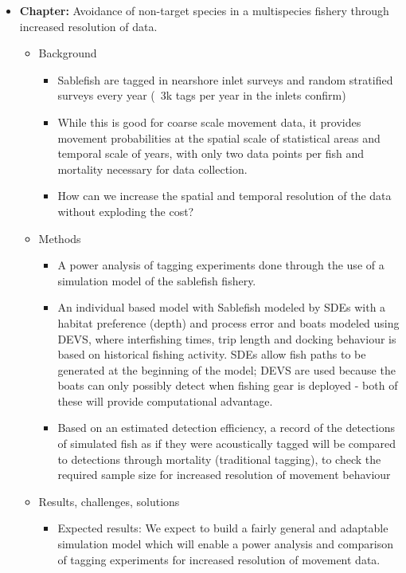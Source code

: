 \documentclass{article}
\newcommand{\sj}[1]{{\color{red}\mbox{}\marginpar{\raggedleft\hspace{0pt}*} #1}}
\begin{document}
\begin{itemize}
  \item {\bf Chapter:} Avoidance of non-target species in a multispecies fishery through increased resolution of data.
    \begin{itemize}
      \item Background
        \begin{itemize}
          \item Sablefish are tagged in nearshore inlet surveys and random stratified surveys every year (~3k tags per year in the inlets \sj{confirm})
          \item While this is good for coarse scale movement data, it provides movement probabilities at the spatial scale of statistical areas and temporal scale of years, with only two data points per fish and mortality necessary for data collection.
          \item How can we increase the spatial and temporal resolution of the data without exploding the cost?
        \end{itemize}
      \item Methods
        \begin{itemize}
          \item A power analysis of tagging experiments done through the use of a simulation model of the sablefish fishery.
          \item An individual based model with Sablefish modeled by SDEs with a habitat preference (depth) and process error and boats modeled using DEVS, where interfishing times, trip length and docking behaviour is based on historical fishing activity. SDEs allow fish paths to be generated at the beginning of the model; DEVS are used because the boats can only possibly detect when fishing gear is deployed - both of these will provide computational advantage.
          \item Based on an estimated detection efficiency, a record of the detections of simulated fish as if they were acoustically tagged will be compared to detections through mortality (traditional tagging), to check the required sample size for increased resolution of movement behaviour
        \end{itemize}
      \item Results, challenges, solutions
        \begin{itemize}
          \item Expected results: We expect to build a fairly general and adaptable simulation model which will enable a power analysis and comparison of tagging experiments for increased resolution of movement data.

\end{itemize}
\end{itemize}
\end{itemize}
\end{document}
